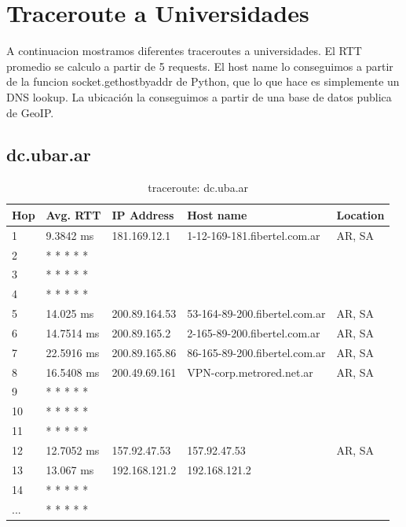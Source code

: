 \section{Traceroute a Universidades}

A continuacion mostramos diferentes traceroutes a universidades. El RTT promedio se calculo a partir de 5 requests. El host name lo conseguimos a partir de la funcion socket.gethostbyaddr de Python, que lo que hace es simplemente un DNS lookup. La ubicación la conseguimos a partir de una base de datos publica de GeoIP.

\subsection{dc.ubar.ar}

\begin{table}[H]
\centering
\caption{traceroute: dc.uba.ar}
\begin{tabular}{@{}lllll@{}}
\toprule
Hop & Avg. RTT & IP Address & Host name & Location\\ \midrule
1 & 9.3842 ms & 181.169.12.1 & 1-12-169-181.fibertel.com.ar & AR, SA\\
2 &  * * * * * &  &  &  \\
3 &  * * * * * &  &  &  \\
4 &  * * * * * &  &  &  \\
5 & 14.025 ms & 200.89.164.53 & 53-164-89-200.fibertel.com.ar & AR, SA\\
6 & 14.7514 ms & 200.89.165.2  & 2-165-89-200.fibertel.com.ar & AR, SA\\
7 & 22.5916 ms & 200.89.165.86 & 86-165-89-200.fibertel.com.ar & AR, SA\\
8 & 16.5408 ms & 200.49.69.161 & VPN-corp.metrored.net.ar & AR, SA\\
9 &  * * * * * &  &  &  \\
10 &  * * * * * &  &  &  \\
11 &  * * * * * &  &  &  \\
12 & 12.7052 ms & 157.92.47.53 & 157.92.47.53 & AR, SA\\
13 & 13.067 ms & 192.168.121.2 & 192.168.121.2 &  \\
14 &  * * * * * &  &  &  \\
... &  * * * * * &  &  &  \\

 \bottomrule
\end{tabular}
\label{dc}
\end{table}

